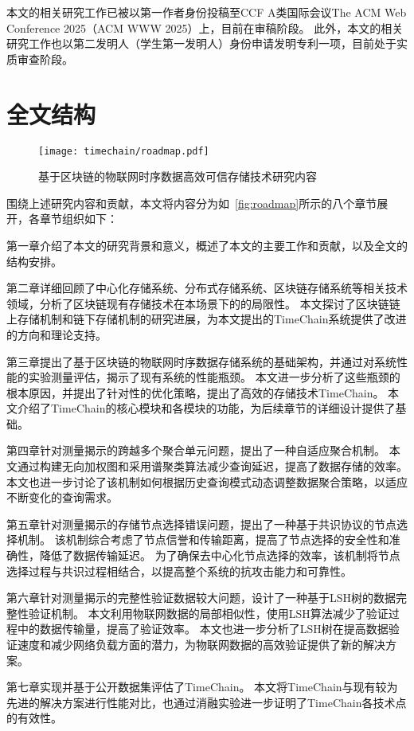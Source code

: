 本文的相关研究工作已被以第一作者身份投稿至CCF A类国际会议The ACM Web Conference 2025（ACM WWW 2025）上，目前在审稿阶段。
此外，本文的相关研究工作也以第二发明人（学生第一发明人）身份申请发明专利一项，目前处于实质审查阶段。

\section{全文结构}

\begin{figure}[t]
    \centering
    \texttt{[image: timechain/roadmap.pdf]}
    \caption{基于区块链的物联网时序数据高效可信存储技术研究内容}
    \label{fig:roadmap}
\end{figure}

围绕上述研究内容和贡献，本文将内容分为如~\autoref{fig:roadmap}所示的八个章节展开，各章节组织如下：

第一章介绍了本文的研究背景和意义，概述了本文的主要工作和贡献，以及全文的结构安排。

第二章详细回顾了中心化存储系统、分布式存储系统、区块链存储系统等相关技术领域，分析了区块链现有存储技术在本场景下的的局限性。
本文探讨了区块链链上存储机制和链下存储机制的研究进展，为本文提出的TimeChain系统提供了改进的方向和理论支持。

第三章提出了基于区块链的物联网时序数据存储系统的基础架构，并通过对系统性能的实验测量评估，揭示了现有系统的性能瓶颈。
本文进一步分析了这些瓶颈的根本原因，并提出了针对性的优化策略，提出了高效的存储技术TimeChain。
本文介绍了TimeChain的核心模块和各模块的功能，为后续章节的详细设计提供了基础。

第四章针对测量揭示的跨越多个聚合单元问题，提出了一种自适应聚合机制。
本文通过构建无向加权图和采用谱聚类算法减少查询延迟，提高了数据存储的效率。
本文也进一步讨论了该机制如何根据历史查询模式动态调整数据聚合策略，以适应不断变化的查询需求。

第五章针对测量揭示的存储节点选择错误问题，提出了一种基于共识协议的节点选择机制。
该机制综合考虑了节点信誉和传输距离，提高了节点选择的安全性和准确性，降低了数据传输延迟。
为了确保去中心化节点选择的效率，该机制将节点选择过程与共识过程相结合，以提高整个系统的抗攻击能力和可靠性。

第六章针对测量揭示的完整性验证数据较大问题，设计了一种基于LSH树的数据完整性验证机制。
本文利用物联网数据的局部相似性，使用LSH算法减少了验证过程中的数据传输量，提高了验证效率。
本文也进一步分析了LSH树在提高数据验证速度和减少网络负载方面的潜力，为物联网数据的高效验证提供了新的解决方案。

第七章实现并基于公开数据集评估了TimeChain。
本文将TimeChain与现有较为先进的解决方案进行性能对比，也通过消融实验进一步证明了TimeChain各技术点的有效性。

